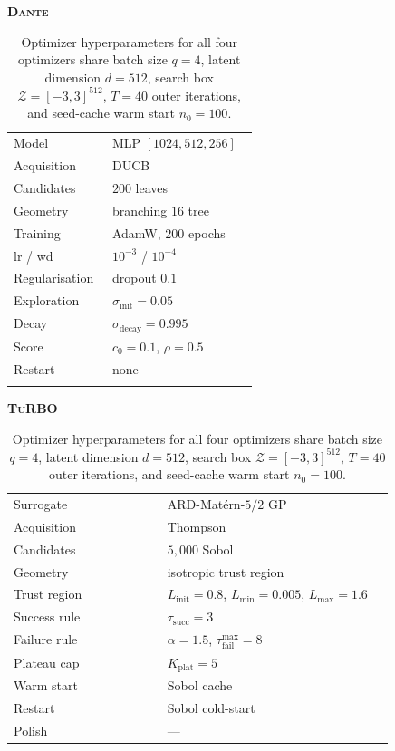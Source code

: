 \documentclass{article}
\newcommand{\dante}{\textsc{Dante}}
\newcommand{\turbo}{\textsc{TuRBO}}
\newcommand{\Z}{\mathcal{Z}}
\begin{document}
\begin{table}[t]
  \caption{Optimizer hyperparameters for all four optimizers share batch size $q=4$, latent dimension $d=512$, search box $\Z=[-3,3]^{512}$, $T=40$ outer iterations, and seed-cache warm start $n_0=100$.}
  \label{tab:hparams-opt}
  \centering
  \scriptsize
  \setlength{\tabcolsep}{3pt}
  \renewcommand{\arraystretch}{1.04}
  \begin{minipage}[t]{0.48\textwidth}
    \centering
    \textbf{\dante{}}\\[1pt]
    \begin{tabular}{@{}p{0.38\linewidth}p{0.56\linewidth}@{}}
      \toprule
      Model & MLP $[1024,512,256]$ \\
      Acquisition & DUCB \\
      Candidates & $200$ leaves \\
      Geometry & branching $16$ tree \\
      Training & AdamW, $200$ epochs \\
      lr / wd & $10^{-3}$ / $10^{-4}$ \\
      Regularisation & dropout $0.1$ \\
      Exploration & $\sigma_{\mathrm{init}}=0.05$ \\
      Decay & $\sigma_{\mathrm{decay}}=0.995$ \\
      Score & $c_0=0.1$, $\rho=0.5$ \\
      Restart & none \\
      \\
      \bottomrule
    \end{tabular}
  \end{minipage}\hfill
  \begin{minipage}[t]{0.48\textwidth}
    \centering
    \textbf{\turbo{}}\\[1pt]
    \begin{tabular}{@{}p{0.38\linewidth}p{0.56\linewidth}@{}}
      \toprule
      Surrogate & ARD-Mat\'ern-$5/2$ GP \\
      Acquisition & Thompson \\
      Candidates & $5{,}000$ Sobol \\
      Geometry & isotropic trust region \\
      Trust region & $L_{\mathrm{init}}=0.8$, $L_{\min}=0.005$, $L_{\max}=1.6$ \\
      Success rule & $\tau_{\mathrm{succ}}=3$ \\
      Failure rule & $\alpha=1.5$, $\tau_{\mathrm{fail}}^{\max}=8$ \\
      Plateau cap & $K_{\mathrm{plat}}=5$ \\
      Warm start & Sobol cache \\
      Restart & Sobol cold-start \\
      Polish & --- \\
      \bottomrule
    \end{tabular}
  \end{minipage}


\end{table}
\end{document}
